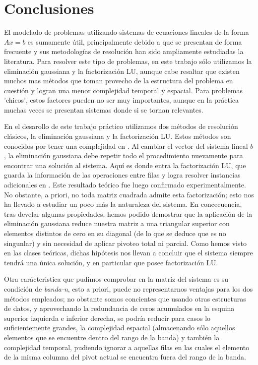 \section{Conclusiones}

El modelado de problemas utilizando sistemas de ecuaciones lineales de la forma $Ax = b$ es sumamente útil, principalmente debido a que se presentan de forma frecuente y sus metodologías de resolución han sido ampliamente estudiadas la literatura. Para resolver este tipo de problemas, en este trabajo sólo utilizamos la eliminación gaussiana y la factorización LU, aunque cabe resaltar que existen muchos mas métodos que toman provecho de la estructura del problema en cuestión y logran una menor complejidad temporal y espacial. Para problemas 'chicos', estos factores pueden no ser muy importantes, aunque en la práctica muchas veces se presentan sistemas donde si se tornan relevantes.

En el desarollo de este trabajo práctico utilizamos dos métodos de resolución clásicos, la eliminación gaussiana y la factorización LU. Estos métodos son conocidos por tener una complejidad en . Al cambiar el vector del sistema lineal $b$, la eliminación gaussiana debe repetir todo el procedimiento nuevamente para encontrar una solución al sistema. Aquí es donde entra la factorización LU, que guarda la información de las operaciones entre filas y logra resolver instancias adicionales en . Este resultado teórico fue luego confirmado experimentalmente. No obstante, a priori, no toda matriz cuadrada admite esta factorización; esto nos ha llevado a estudiar un poco más la naturaleza del sistema. En concecuencia, tras develar algunas propiedades, hemos podido demostrar que la aplicación de la eliminación gaussiana reduce nuestra matriz a una triangular superior con elementos distintos de cero en su diagonal (de lo que se deduce que es no singunlar) y sin necesidad de aplicar pivoteo total ni parcial. Como hemos visto en las clases teóricas, dichas hipótesis nos llevan a concluir que el sistema siempre tendrá una única solución, y en particular que posee factorización LU.

Otra carácteristica que pudimos comprobar en la matriz del sistema es su condición de \textit{banda-n}, esto a priori, puede no representarnos ventajas para los dos métodos empleados; no obstante somos concientes que usando otras estructuras de datos, y aprovechando la redundancia de ceros acumulados en la esquina superior izquierda e inferior derecha, se podría reducir para casos lo suficientemente grandes, la complejidad espacial (almacenando sólo aquellos elementos que se encuentre dentro del rango de la banda) y también la complejidad temporal, pudiendo ignorar a aquellas filas en las cuales el elemento de la misma columna del pivot actual se encuentra fuera del rango de la banda. 

